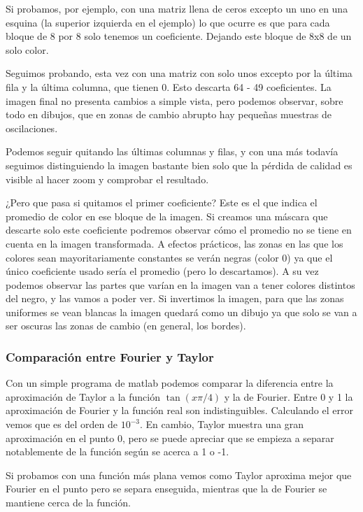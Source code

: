 		Si probamos, por ejemplo, con una matriz llena de ceros excepto un uno en una esquina (la superior izquierda en el ejemplo) lo que ocurre es que para cada bloque de 8 por 8 solo tenemos un coeficiente. Dejando este bloque de 8x8 de un solo color.

		Seguimos probando, esta vez con una matriz con solo unos excepto por la última fila y la última columna, que tienen 0. Esto descarta 64 - 49 coeficientes. La imagen final no presenta cambios a simple vista, pero podemos observar, sobre todo en dibujos, que en zonas de cambio abrupto hay pequeñas muestras de oscilaciones.


		Podemos seguir quitando las últimas columnas y filas, y con una más todavía seguimos distinguiendo la imagen bastante bien solo que la pérdida de calidad es visible al hacer zoom y comprobar el resultado.

		¿Pero que pasa si quitamos el primer coeficiente? Este es el que indica el promedio de color en ese bloque de la imagen. Si creamos una máscara que descarte solo este coeficiente podremos observar cómo el promedio no se tiene en cuenta en la imagen transformada. A efectos prácticos, las zonas en las que los colores sean mayoritariamente constantes se verán negras (color 0) ya que el único coeficiente usado sería el promedio (pero lo descartamos). A su vez podemos observar las partes que varían en la imagen van a tener colores distintos del negro, y las vamos a poder ver. Si invertimos la imagen, para que las zonas uniformes se vean blancas la imagen quedará como un dibujo ya que solo se van a ser oscuras las zonas de cambio (en general, los bordes).

	\subsubsection{Comparación entre Fourier y Taylor}

		Con un simple programa de matlab podemos comparar la diferencia entre la aproximación de Taylor a la función $\tan(x \pi/4)$ y la de Fourier. Entre 0 y 1 la aproximación de Fourier y la función real son indistinguibles. Calculando el error vemos que es del orden de $10^{-3}$. En cambio, Taylor muestra una gran aproximación en el punto 0, pero se puede apreciar que se empieza a separar notablemente de la función según se acerca a 1 o -1.

		Si probamos con una función más plana vemos como Taylor aproxima mejor que Fourier en el punto pero se separa enseguida, mientras que la de Fourier se mantiene cerca de la función.

